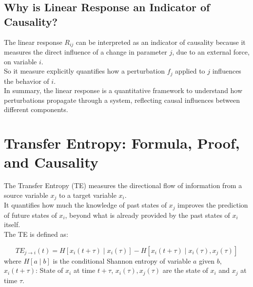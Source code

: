 \documentclass[English, Lau, oneside]{sapthesis}
\begin{document}
\subsection{Why is Linear Response an Indicator of Causality?}
\noindent The linear response \(R_{ij}\) can be interpreted as an indicator of causality because it measures the direct influence of a change in parameter \(j\), due to an external force, on variable \(i\). \\
So it measure explicitly quantifies how a perturbation \(f_j\) applied to \(j\) influences the behavior of \(i\).\\
In summary, the linear response is a quantitative framework to understand how perturbations propagate through a system, reflecting causal influences between different components.


\newpage
\section{Transfer Entropy: Formula, Proof, and Causality}
\noindent The Transfer Entropy (TE) measures the directional flow of information from a source variable \(x_j\) to a target variable \(x_i\).\\
It quantifies how much the knowledge of past states of \(x_j\) improves the prediction of future states of \(x_i\), beyond what is already provided by the past states of \(x_i\) itself. \\
The TE is defined as:\cite{ref13}

\[
TE_{j \to i}(t) = H[x_i(t + \tau) \mid x_i(\tau)] - H[x_i(t + \tau) \mid x_i(\tau), x_j(\tau)]
\]
where \(H[a \mid b]\) is the conditional Shannon entropy of variable \(a\) given \(b\), \(x_i(t + \tau)\): State of \(x_i\) at time \(t + \tau\), \(x_i(\tau), x_j(\tau)\) are the state of \(x_i\) and \(x_j\) at time \(\tau\).
\end{document}
